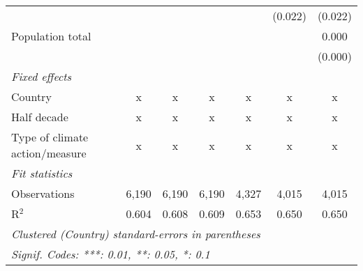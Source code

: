 \begin{tabular}{lcccccc}
                                                                                       &               &                &                &                & (0.022)        & (0.022)\\   
   Population total                                                                    &               &                &                &                &                & 0.000\\   
                                                                                       &               &                &                &                &                & (0.000)\\   
   \emph{Fixed effects}\\
   Country                                                                             & x             & x              & x              & x              & x              & x\\  
   Half decade                                                                         & x             & x              & x              & x              & x              & x\\  
   Type of climate action/measure                                                      & x             & x              & x              & x              & x              & x\\  
   \midrule \emph{Fit statistics}\\
   Observations                                                                        & 6,190         & 6,190          & 6,190          & 4,327          & 4,015          & 4,015\\  
   R$^2$                                                                               & 0.604         & 0.608          & 0.609          & 0.653          & 0.650          & 0.650\\  
   \midrule
   \multicolumn{7}{l}{\emph{Clustered (Country) standard-errors in parentheses}}\\
   \multicolumn{7}{l}{\emph{Signif. Codes: ***: 0.01, **: 0.05, *: 0.1}}\\
\end{tabular}
\par\endgroup



